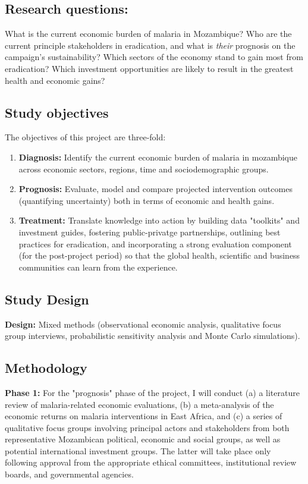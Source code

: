 \documentclass{article}
\begin{document}
\begin{multicols}{2}
\subsection*{Research questions:} What is the current economic burden of malaria in Mozambique?  Who are the current principle stakeholders in eradication, and what is \emph{their} prognosis on the campaign's sustainability?  Which sectors of the economy stand to gain most from eradication?  Which investment opportunities are likely to result in the greatest health and economic gains?

\subsection*{Study objectives}
The objectives of this project are three-fold: 
\begin{enumerate}
\item \textbf{Diagnosis:} Identify the current economic burden of malaria in mozambique across economic sectors, regions, time and sociodemographic groups.
\item \textbf{Prognosis:} Evaluate, model and compare projected intervention outcomes (quantifying uncertainty) both in terms of economic and health gains.
\item \textbf{Treatment:} Translate knowledge into action by building data "toolkits" and investment guides, fostering public-privatge partnerships, outlining best practices for eradication, and incorporating a strong evaluation component (for the post-project period) so that the global health, scientific and business communities can learn from the experience. 
\end{enumerate}


\subsection*{Study Design}
\noindent \textbf{Design:} Mixed methods (observational economic analysis, qualitative focus group interviews, probabilistic sensitivity analysis and Monte Carlo simulations). \\


\subsection*{Methodology}

\noindent \textbf{Phase 1:} For the "prognosis" phase of the project, I will conduct (a) a literature review of malaria-related economic evaluations, (b) a meta-analysis of the economic returns on malaria interventions in East Africa, and (c) a series of qualitative focus groups involving principal actors and stakeholders from both representative Mozambican political, economic and social groups, as well as potential international investment groups. The latter will take place only following approval from the appropriate ethical committees, institutional review boards, and governmental agencies. \\


\end{multicols}
\end{document}
